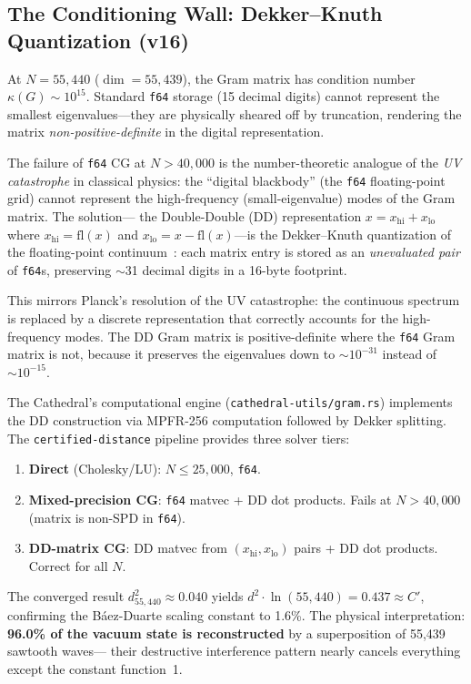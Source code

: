 \documentclass[11pt,a4paper]{article}
\begin{document}
\subsection{The Conditioning Wall: Dekker--Knuth Quantization (v16)}
\label{sec:dd-precision}

At $N = 55{,}440$ ($\dim = 55{,}439$), the Gram matrix has condition number
$\kappa(G) \sim 10^{15}$. Standard \texttt{f64} storage (15 decimal digits)
cannot represent the smallest eigenvalues---they are physically sheared off
by truncation, rendering the matrix \emph{non-positive-definite} in the
digital representation.

\begin{principle}
The failure of \texttt{f64} CG at $N > 40{,}000$ is the number-theoretic
analogue of the \emph{UV catastrophe} in classical physics: the ``digital
blackbody'' (the \texttt{f64} floating-point grid) cannot represent the
high-frequency (small-eigenvalue) modes of the Gram matrix. The solution---
the Double-Double (DD) representation $x = x_{\mathrm{hi}} + x_{\mathrm{lo}}$
where $x_{\mathrm{hi}} = \mathrm{fl}(x)$ and
$x_{\mathrm{lo}} = x - \mathrm{fl}(x)$---is the Dekker--Knuth quantization
of the floating-point continuum~\cite{dekker1971,knuth1997}: each matrix
entry is stored as an \emph{unevaluated pair} of \texttt{f64}s, preserving
$\sim$31 decimal digits in a 16-byte footprint.

This mirrors Planck's resolution of the UV catastrophe: the continuous
spectrum is replaced by a discrete representation that correctly accounts
for the high-frequency modes. The DD Gram matrix is positive-definite where
the \texttt{f64} Gram matrix is not, because it preserves the eigenvalues
down to $\sim 10^{-31}$ instead of $\sim 10^{-15}$.
\end{principle}

The Cathedral's computational engine (\texttt{cathedral-utils/gram.rs})
implements the DD construction via MPFR-256 computation followed by
Dekker splitting. The \texttt{certified-distance} pipeline provides
three solver tiers:
\begin{enumerate}
  \item \textbf{Direct} (Cholesky/LU): $N \leq 25{,}000$, \texttt{f64}.
  \item \textbf{Mixed-precision CG}: \texttt{f64} matvec + DD dot products.
    Fails at $N > 40{,}000$ (matrix is non-SPD in \texttt{f64}).
  \item \textbf{DD-matrix CG}: DD matvec from $(x_{\mathrm{hi}}, x_{\mathrm{lo}})$
    pairs + DD dot products. Correct for all $N$.
\end{enumerate}
The converged result $d^2_{55{,}440} \approx 0.040$ yields
$d^2 \cdot \ln(55{,}440) = 0.437 \approx C'$, confirming the
B\'aez-Duarte scaling constant to 1.6\%.
The physical interpretation: \textbf{96.0\% of the vacuum state
is reconstructed} by a superposition of 55,439 sawtooth waves---
their destructive interference pattern nearly cancels everything
except the constant function~1.
\end{document}

